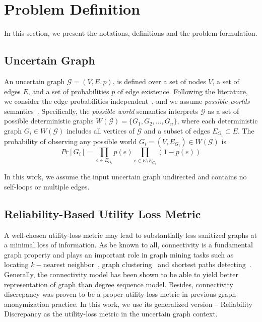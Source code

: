 \section{Problem Definition}
\label{sec:notation}

In this section, we present the notations, definitions and the problem formulation.  

\subsection{Uncertain Graph}
An uncertain graph $\mathcal{G}=(V,E,\mathit{p})$, is defined over a set of nodes $V$, a set of edges $E$, and a set of probabilities $\mathit{p}$ of edge existence. Following the literature, we consider the edge probabilities independent~\cite{Potamias_K_2010,Zhao_Detecting_2014,Jin_Distance_2011}, and we assume \emph{possible-worlds} semantics~\cite{Colbourn_Colbourn_1987}. Specifically, the \emph{possible world} semantics interprets $\mathcal{G}$ as a set of possible deterministic graphs 
$W(\mathcal{G}) = \{G_1, G_2, ..., G_n\}$, where each deterministic graph $G_i \in W(\mathcal{G})$ includes all vertices of $\mathcal{G}$ 
and a subset of edges $E_{G_i} \subset E$.  
The probability of observing any possible world $G_i=(V,E_{G_i}) \in W(\mathcal{G})$ is    
\begin{equation*}
    Pr[G_i]=\prod_{e \in E_{G_i}} {\mathit{p}(e)} \prod_{e \in E \setminus E_{G_i}} (1-\mathit{p}(e))
\end{equation*}

In this work, we assume the input uncertain graph undirected and contains no self-loops or multiple edges. 


\subsection{Reliability-Based Utility Loss Metric}
A well-chosen utility-loss metric may lead to substantially less sanitized graphs at a minimal loss of information. 
As be known to all, connectivity is a fundamental graph property and plays an important role in graph mining tasks such as locating $k-$nearest neighbor~\cite{Potamias_K_2010}, graph clustering~\cite{Asthana_Predicting_2004} and shortest paths detecting~\cite{Zhao_Detecting_2014}. Generally, the connectivity model has been shown to be able to yield better representation of graph than degree sequence model. Besides, connectivity discrepancy was proven to be a proper utility-loss metric in previous graph anonymization practice. In this work, we use its generalized version -- Reliability Discrepancy as the utility-loss metric in the uncertain graph context. 
 
